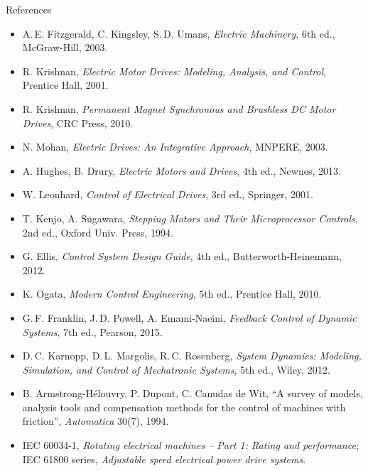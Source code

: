 \documentclass[aspectratio=169,10pt]{beamer}
\begin{document}
\begin{frame}{References}
\scriptsize
\begin{itemize}\setlength\itemsep{1pt}
\item A.\,E. Fitzgerald, C. Kingsley, S.\,D. Umans, \textit{Electric Machinery}, 6th ed., McGraw-Hill, 2003.
\item R. Krishnan, \textit{Electric Motor Drives: Modeling, Analysis, and Control}, Prentice Hall, 2001.
\item R. Krishnan, \textit{Permanent Magnet Synchronous and Brushless DC Motor Drives}, CRC Press, 2010.
\item N. Mohan, \textit{Electric Drives: An Integrative Approach}, MNPERE, 2003.
\item A. Hughes, B. Drury, \textit{Electric Motors and Drives}, 4th ed., Newnes, 2013.
\item W. Leonhard, \textit{Control of Electrical Drives}, 3rd ed., Springer, 2001.
\item T. Kenjo, A. Sugawara, \textit{Stepping Motors and Their Microprocessor Controls}, 2nd ed., Oxford Univ. Press, 1994.
\item G. Ellis, \textit{Control System Design Guide}, 4th ed., Butterworth-Heinemann, 2012.
\item K. Ogata, \textit{Modern Control Engineering}, 5th ed., Prentice Hall, 2010.
\item G.\,F. Franklin, J.\,D. Powell, A. Emami-Naeini, \textit{Feedback Control of Dynamic Systems}, 7th ed., Pearson, 2015.
\item D.\,C. Karnopp, D.\,L. Margolis, R.\,C. Rosenberg, \textit{System Dynamics: Modeling, Simulation, and Control of Mechatronic Systems}, 5th ed., Wiley, 2012.
\item B. Armstrong-H\'elouvry, P. Dupont, C. Canudas de Wit, ``A survey of models, analysis tools and compensation methods for the control of machines with friction'', \textit{Automatica} 30(7), 1994.
\item IEC 60034-1, \textit{Rotating electrical machines -- Part 1: Rating and performance}; IEC 61800 series, \textit{Adjustable speed electrical power drive systems}.
\end{itemize}
\end{frame}
\end{document}
